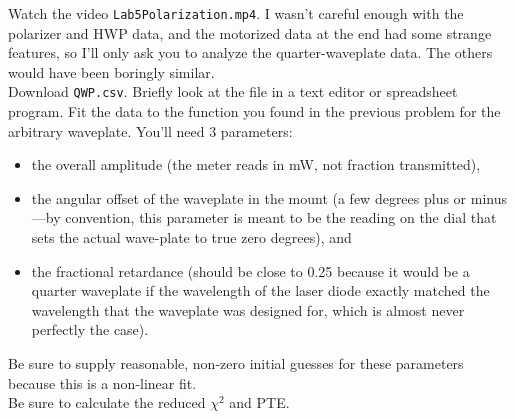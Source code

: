 \documentclass[11pt]{hmcpset}
\begin{document}
\begin{problem}
	Watch the video \texttt{Lab5Polarization.mp4}. I wasn't careful enough with the polarizer and HWP data, and the motorized data at the end had some strange features, so I'll only ask you to analyze the quarter-waveplate data. The others would have been boringly similar. \\
	
	Download \texttt{QWP.csv}. Briefly look at the file in a text editor or spreadsheet program. Fit the data to the function you found in the previous problem for the arbitrary waveplate. You'll need 3 parameters:
	\begin{itemize}
		\item the overall amplitude (the meter reads in mW, not fraction transmitted),
		\item the angular offset of the waveplate in the mount (a few degrees plus or minus---by convention, this parameter is meant to be the reading on the dial that sets the actual wave-plate to true zero degrees), and
		\item the fractional retardance (should be close to 0.25 because it would be a quarter waveplate if the wavelength of the laser diode exactly matched the wavelength that the waveplate was designed for, which is almost never perfectly the case).
	\end{itemize}
	Be sure to supply reasonable, non-zero initial guesses for these parameters because this is a non-linear fit. \\
	
	Be sure to calculate the reduced $\chi^2$ and PTE.
\end{problem}

\begin{solution}
	\vfill
\end{solution}
\pagebreak
\end{document}
